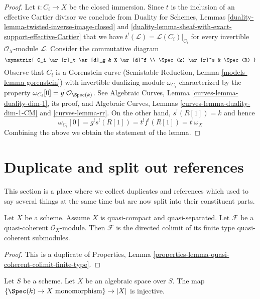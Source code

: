 \begin{proof}
Let $t : C_i \to X$ be the closed immersion. Since $t$ is
the inclusion of an effective Cartier divisor we conclude from
Duality for Schemes, Lemmas
\ref{duality-lemma-twisted-inverse-image-closed} and
\ref{duality-lemma-sheaf-with-exact-support-effective-Cartier}
that we have $t^!(\mathcal{L}) = \mathcal{L}(C_i)|_{C_i}$
for every invertible $\mathcal{O}_X$-module $\mathcal{L}$.
Consider the commutative diagram
$$
\xymatrix{
C_i \ar[r]_t \ar[d]_g & X \ar[d]^f \\
\Spec(k) \ar[r]^s & \Spec(R)
}
$$
Observe that $C_i$ is a Gorenstein curve
(Semistable Reduction, Lemma \ref{models-lemma-gorenstein}) with invertible
dualizing module $\omega_{C_i}$ characterized by the property
$\omega_{C_i}[0] = g^!\mathcal{O}_{\Spec(k)}$. See
Algebraic Curves, Lemma \ref{curves-lemma-duality-dim-1}, its proof, and
Algebraic Curves, Lemmas \ref{curves-lemma-duality-dim-1-CM} and
\ref{curves-lemma-rr}.
On the other hand, $s^!(R[1]) = k$ and hence
$$
\omega_{C_i}[0] =
g^! s^!(R[1]) = t^!f^!(R[1]) = t^!\omega_X
$$
Combining the above we obtain the statement of the lemma.
\end{proof}






\section{Duplicate and split out references}
\label{section-duplicates}

\noindent
This section is a place where we collect duplicates
and references which used to say several things at the
same time but are now split into their constituent parts.

\begin{lemma}
\label{lemma-directed-colimit-finite-type}
Let $X$ be a scheme. Assume $X$ is quasi-compact and quasi-separated.
Let $\mathcal{F}$ be a quasi-coherent $\mathcal{O}_X$-module.
Then $\mathcal{F}$ is the directed colimit of its finite type
quasi-coherent submodules.
\end{lemma}

\begin{proof}
This is a duplicate of Properties, Lemma
\ref{properties-lemma-quasi-coherent-colimit-finite-type}.
\end{proof}

\begin{lemma}
\label{lemma-points-monomorphism}
Let $S$ be a scheme. Let $X$ be an algebraic space over $S$.
The map $\{\Spec(k) \to X \text{ monomorphism}\} \to |X|$ is injective.
\end{lemma}

